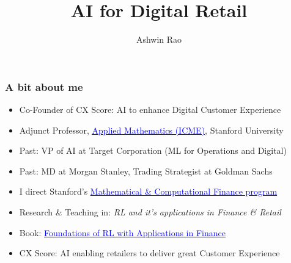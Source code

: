 \documentclass[handout]{beamer}
\title[AI for Digital Retail]{AI for Digital Retail} %
\author{Ashwin Rao} %
\institute[Stanford] %
{Stanford University
}
\date{} %
\begin{document}
\begin{frame}
\titlepage %
\end{frame}



\begin{frame}
\frametitle{A bit about me}
\pause
\begin{itemize}[<+->]
\item Co-Founder of CX Score: AI to enhance Digital Customer Experience
\item Adjunct Professor, \href{https://icme.stanford.edu/}{\underline{\textcolor{blue}{Applied Mathematics (ICME)}}}, Stanford University
\item Past: VP of AI at Target Corporation (ML for Operations and Digital)
\item Past: MD at Morgan Stanley, Trading Strategist at Goldman Sachs
\item I direct Stanford's \href{https://mcf.stanford.edu/}{\underline{\textcolor{blue}{Mathematical \& Computational Finance program}}}
\item Research \& Teaching in: {\em RL and it's applications in Finance \& Retail}
\item Book:  \href{https://www.amazon.com/Foundations-Reinforcement-Learning-Applications-Finance/dp/1032124121}{\underline{\textcolor{blue}{Foundations of RL with Applications in Finance}}}
\item CX Score: AI enabling retailers to deliver great Customer Experience
\end{itemize}
\end{frame}
\end{document}
